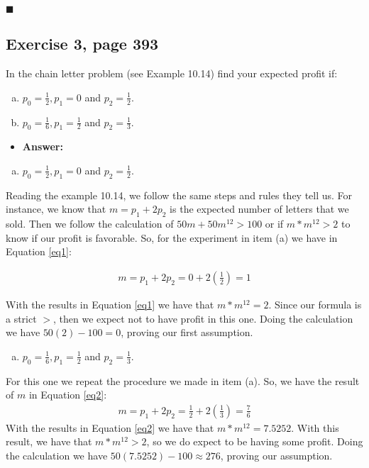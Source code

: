 \documentclass{article}
\begin{document}
\begin{flushright}
$\blacksquare$
\end{flushright}

\subsection{Exercise 3, page 393}

In the chain letter problem (see Example 10.14) find your expected profit if: 

\begin{enumerate}[(a)]
\item $p_0=\frac{1}{2}, p_1 = 0$ and $p_2 = \frac{1}{2}$.
\item $p_0=\frac{1}{6}, p_1 = \frac{1}{2}$ and $p_2 = \frac{1}{3}$.
\end{enumerate}

\begin{itemize}
\item \textbf{Answer:}
\end{itemize}

\begin{enumerate}[(a)]
\item $p_0=\frac{1}{2}, p_1 = 0$ and $p_2 = \frac{1}{2}$.
\end{enumerate}

Reading the example 10.14, we follow the same steps and rules they tell us. For instance, we know that $m = p_1 + 2p_2$ is the expected number of letters that we sold. Then we follow the calculation of $50m + 50m^{12} > 100$ or if $m * m^{12} > 2$ to know if our profit is favorable. So, for the experiment in item (a) we have in Equation \ref{eq1}:

 \begin{eqnarray}
\label{eq1}
m = p_1 + 2p_2 = 0 + 2\left(\frac{1}{2}\right) = 1
\end{eqnarray}

With the results in Equation \ref{eq1} we have that $m * m^{12} = 2$. Since our formula is a strict $>$, then we expect not to have profit in this one. Doing the calculation we have $50(2) - 100 = 0$, proving our first assumption.

\begin{enumerate}[(b)]
\item $p_0=\frac{1}{6}, p_1 = \frac{1}{2}$ and $p_2 = \frac{1}{3}$.
\end{enumerate}

For this one we repeat the procedure we made in item (a). So, we have the result of $m$ in Equation \ref{eq2}:
 \begin{eqnarray}
\label{eq2}
m = p_1 + 2p_2 = \frac{1}{2} + 2\left(\frac{1}{3}\right) = \frac{7}{6} 
\end{eqnarray}
With the results in Equation \ref{eq2} we have that $m * m^{12} = 7.5252$. With this result, we have that $m * m^{12} > 2$, so we do expect to be having some profit. Doing the calculation we have $50(7.5252) - 100 \approx 276$, proving our assumption.\\
\end{document}
